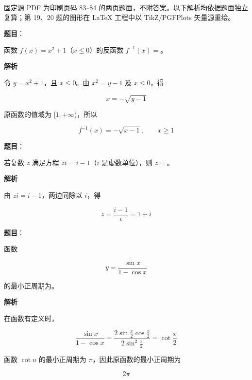 

\begin{gktip}
固定源 PDF 为印刷页码 83–84 的两页题面，不附答案。以下解析均依据题面独立复算；第 19、20 题的图形在 LaTeX 工程中以 TikZ/PGFPlots 矢量源重绘。
\end{gktip}


\begin{answer}

\textbf{题目}：

函数 $f(x)=x^2+1$（$x\le0$）的反函数 $f^{-1}(x)=$\gkblank{}。

\textbf{解析}

令 $y=x^2+1$，且 $x\le0$。由 $x^2=y-1$ 及 $x\le0$，得

\nopagebreak[4]
\[
x=-\sqrt{y-1}
\]

原函数的值域为 $[1,+\infty)$，所以

\nopagebreak[4]
\[
f^{-1}(x)=-\sqrt{x-1},\qquad x\ge1
\]


\end{answer}
\begin{answer}

\textbf{题目}：

若复数 $z$ 满足方程 $zi=i-1$（$i$ 是虚数单位），则 $z=$\gkblank{}。

\textbf{解析}

由 $zi=i-1$，两边同除以 $i$，得

\nopagebreak[4]
\[
z=\frac{i-1}{i}=1+i
\]


\end{answer}
\begin{answer}

\textbf{题目}：

函数

\nopagebreak[4]
\[
y=\dfrac{\sin x}{1-\cos x}
\]

的最小正周期为\gkblank{}。

\textbf{解析}

在函数有定义时，

\nopagebreak[4]
\[
\frac{\sin x}{1-\cos x}
=\frac{2\sin\frac{x}{2}\cos\frac{x}{2}}{2\sin^2\frac{x}{2}}
=\cot\frac{x}{2}
\]

函数 $\cot u$ 的最小正周期为 $\pi$，因此原函数的最小正周期为

\nopagebreak[4]
\[
2\pi
\]


\end{answer}
